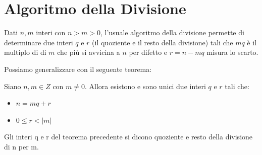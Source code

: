 \documentclass[a4paper,12pt, oneside]{book}
\begin{document}
\chapter{Algoritmo della Divisione}
\begin{algoritmo}
	Dati $n,m$ interi con $n > m > 0$, l'usuale algoritmo della divisione permette di determinare due interi $q$ e $r$ (il quoziente e il resto della divisione) tali che $mq$ è il multiplo di di $m$ che più si avvicina a $n$ per difetto e $r = n - mq$ misura lo scarto.
\end{algoritmo}
Possiamo generalizzare con il seguente teorema:
\begin{teorema}
	Siano $n, m \in Z$ con $m \not = 0$. Allora esistono e sono unici due interi $q$ e $r$ tali che:
	\begin{itemize}
		\item $n = mq + r$
		\item $0 \leq r < |m|$
	\end{itemize}
\end{teorema}
\begin{definizione}
	Gli interi q e r del teorema precedente si dicono quoziente e resto della divisione di n per m.
\end{definizione}
\end{document}
